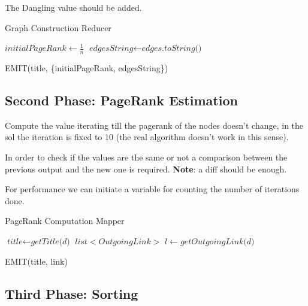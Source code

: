 The Dangling value should be added.
\begin{algorithm}
	\caption{Graph Construction Reducer}\label{Reducer}
		\begin{algorithmic}[1]
					\State $\textit{initialPageRank} \gets \frac{1}{n} $
					\State $ \textit{edgesString} \gets \textit{edges.toString()}$
		
					\State EMIT(title, \{initialPageRank, edgesString\})
				
			\EndProcedure
	\end{algorithmic}
\end{algorithm}



\subsection{Second Phase: PageRank Estimation}
Compute the value iterating till the pagerank of the nodes doesn't change, in the sol the iteration is fixed to 10 (the real algorithm doesn't work in this sense).

In order to check if the values are the same or not a comparison between the previous output and the new one is required. \textbf{Note}: a diff should be enough.

For performance we can initiate a variable for counting the number of iterations done.

\begin{algorithm}
	\caption{PageRank Computation Mapper}\label{Mapper}
		\begin{algorithmic}[1]
					\State $\textit{title} \gets \textit{getTitle(d)}$
					\State $ \textit{list$<$OutgoingLink$>$ l} \gets \textit{getOutgoingLink(d)}$
		
							\State EMIT(title, link)
						\EndFor
					\EndIf
			\EndProcedure
	\end{algorithmic}
\end{algorithm}



\subsection{Third Phase: Sorting}